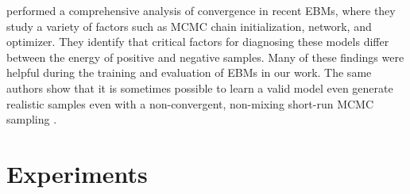 \documentclass{article}
\begin{document}
\citet{nijkamp2019anatomy, nijkamp2019learning} performed a comprehensive analysis of convergence in recent EBMs, where they study a variety of factors such as MCMC chain initialization, network, and optimizer. They identify that critical factors for diagnosing these models differ between the energy of positive and negative samples. Many of these findings were helpful during the training and evaluation of EBMs in our work. The same authors show that it is sometimes possible to learn a valid model even generate realistic samples even with a non-convergent, non-mixing short-run MCMC sampling  \cite{nijkamp2019learning}. 


\vspace*{-0.5ex}
\section{Experiments}
\label{sec:experiments}
\vspace*{-1.5ex}


\end{document}
